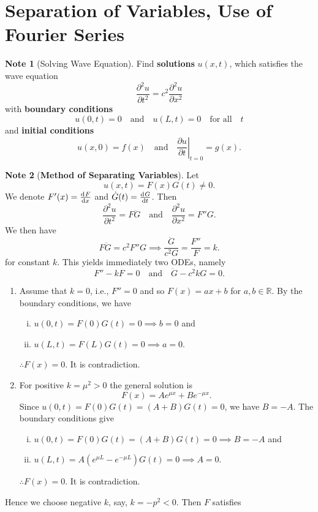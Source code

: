 \documentclass[12pt,openany]{book}
\theoremstyle{definition}
\newtheorem*{note}{Note}
\newcommand{\R}{\mathbb{R}}
\newcommand{\ie}{\textnormal{i.e.}}
\begin{document}
	\section{Separation of Variables, Use of Fourier Series}
	\begin{note}[Solving Wave Equation]
		Find \textbf{solutions} \( u(x, t) \), which satisfies the wave equation
		\[
		\frac{\partial^2 u}{\partial t^2} = c^2 \frac{\partial^2 u}{\partial x^2}
		\]
		with \textbf{boundary conditions}
		\[
		u(0, t) = 0 \quad \text{and} \quad u(L, t) = 0 \quad \text{for all} \quad t
		\]
		and \textbf{initial conditions}
		\[
		u(x, 0) = f(x) \quad \text{and} \quad \left. \frac{\partial u}{\partial t} \right|_{t=0} = g(x).
		\]
	\end{note}
	\begin{note}[\bf Method of Separating Variables]
		Let $$u(x, t) = F(x)G(t)\neq 0.$$
		We denote $F'(x)=\od{F}{x}$ and $\dot{G}(t)=\od{G}{t}$. Then \[
		\frac{\partial^2 u}{\partial t^2} = F \ddot{G} \quad \text{and} \quad \frac{\partial^2 u}{\partial x^2} = F'' G.
		\] We then have \[
		F \ddot{G} = c^2 F'' G\implies
		\frac{\ddot{G}}{c^2 G} = \frac{F''}{F}=k.
		\] for constant $k$. This yields immediately two ODEs, namely
		\[
		F'' - kF = 0 \quad \text{and} \quad \ddot{G} - c^2 kG = 0.
		\] \begin{enumerate}[(1)]
			\item Assume that $k=0$, \ie, $F''=0$ and so $F(x)=ax+b$ for $a,b\in\R$. By the boundary conditions, we have \begin{enumerate}[(i)]
				\item $u(0, t) = F(0)G(t) = 0\implies b=0$ and
				\item $u(L, t) = F(L)G(t) = 0\implies a=0$.
			\end{enumerate} $\therefore F(x)=0$. It is contradiction.
		\item For positive \( k = \mu^2>0 \) the general solution is
		\[
		F(x) = Ae^{\mu x} + Be^{-\mu x}.
		\] Since $u(0,t)=F(0)G(t)=(A+B)G(t)=0$, we have $B=-A$. The boundary conditions give \begin{enumerate}[(i)]
			\item $u(0,t)=F(0)G(t)=(A+B)G(t)=0\implies B=-A$ and
			\item $u(L, t) = A(e^{\mu L}-e^{-\mu L})G(t)=0\implies A=0$.
		\end{enumerate} $\therefore F(x)=0$. It is contradiction.
		\end{enumerate}
		Hence we choose negative \( k \), say, \( k = -p^2<0 \). Then \( F \) satisfies

\end{note}
\end{document}
